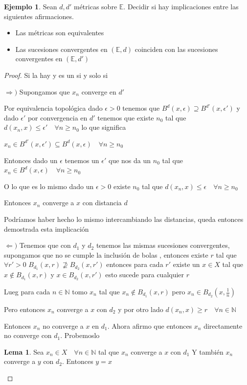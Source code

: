 \documentclass[12pt]{article}
\newcommand{\E}{\mathbb{E}}
\newcommand{\N}{\mathbb{N}}
\newcommand{\Ra}{\Rightarrow}
\theoremstyle{definition}
\newtheorem{lemma}[theorem]{Lema}
\newtheorem{ex}{Ejemplo}
\begin{document}
\begin{ex}
  Sean $d,d'$ métricas sobre $\E$. Decidir si hay implicaciones entre las siguientes afirmaciones.
  \begin{itemize}
    \item Las métricas son equivalentes
    \item Las sucesiones convergentes en $(\E,d)$ coinciden con las sucesiones convergentes en $(\E,d')$
  \end{itemize}
  \begin{proof}
    Si la hay y es un si y solo si 

  $\Ra )$ Supongamos que $x_n$ converge en $d'$ 

Por equivalencia topológica dado $\epsilon > 0$ tenemos que $B^{d}(x,\epsilon) \supseteq B^{d'}(x,\epsilon ')$ y dado $\epsilon '$ por convergencia en $d'$ tenemos que existe $n_0$ tal que $d(x_n , x) \leq \epsilon ' \quad \forall n \geq n_0$ lo que significa 

$x_n \in B^{d'}(x,\epsilon ') \subseteq B^{d}(x,\epsilon) \quad \forall n \geq n_0$

Entonces dado un $\epsilon$ tenemos un $\epsilon '$ que nos da un $n_0$ tal que $x_n \in B^{d}(x,\epsilon) \quad \forall n \geq n_0$

O lo que es lo mismo dado un $\epsilon > 0$ existe $n_0$ tal que $d(x_n,x) \leq \epsilon \quad \forall n \geq n_0$

Entonces $x_n$ converge a $x$ con distancia $d$

Podríamos haber hecho lo mismo intercambiando las distancias, queda entonces demostrada esta implicación

$\Leftarrow ) $ Tenemos que con $d_1$ y $d_2$ tenemos las mismas sucesiones convergentes, supongamos que no se cumple la inclusión de bolas , entonces existe $r$ tal que $\forall r'>0$ $B_{d_1}(x,r) \not\supseteq B_{d_2}(x,r')$ entonces para cada $r'$ existe un $x \in X $ tal que $x \notin  B_{d_1}(x,r)$ y $x \in B_{d_2}(x,r')$ esto sucede para cualquier $r$

Lueg para cada $n \in \N$ tomo $x_n$ tal que $x_{n} \notin B_{d_1}(x,r)$ pero $  x_n \in B_{d_2}(x,\frac{1}{n}) $

Pero entonces $x_n$ converge a $x$ con $d_2$ y por otro lado $d(x_n,x) \geq r \quad  \forall n \in \N$

Entonces $x_n$ no converge a $x$ en $d_1$. Ahora afirmo que entonces $x_n$ directamente no converge con $d_1$. Probemoslo
\newpage
\begin{lemma} Sea $x_n \in X \quad \forall n \in \N$ tal que $x_n$ converge a $x$ con $d_1$ Y también $x_n$ converge a $y$ con $d_2$. Entonces $ y = x$ 


\end{lemma}
\end{proof}
\end{ex}
\end{document}
